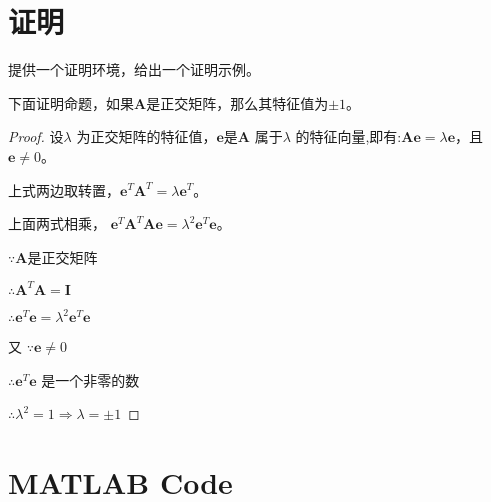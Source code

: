 

\lstset{language=Matlab}

\appendix
\begin{appendix}
\chapter{证明}
\begin{spacing}{1.5}
提供一个证明环境，给出一个证明示例。

下面证明命题，如果$\bm{A}$是正交矩阵，那么其特征值为$\pm1$。
\begin{proof}
设$\lambda$ 为正交矩阵的特征值，$\bm{e}$是$\bm{A}$ 属于$\lambda$ 的特征向量,即有:$\bm{A}\bm{e}=\lambda\bm{e}$，且$\bm{e}\neq0$。

上式两边取转置，$\bm{e}^{T}\bm{A}^{T}=\lambda\bm{e}^{T}$。

上面两式相乘， $\bm{e}^{T}\bm{A}^{T}\bm{A}\bm{e}=\lambda^2\bm{e}^{T}\bm{e}$。

$\because\bm{A}$是正交矩阵

$\therefore\bm{A}^{T}\bm{A}=\bm{I}$

$\therefore\bm{e}^{T}\bm{e}=\lambda^2\bm{e}^{T}\bm{e}$

又 $\because\bm{e}\neq0$

$\therefore\bm{e}^{T}\bm{e}$ 是一个非零的数

$\therefore\lambda^2=1\Rightarrow\lambda=\pm1$
\end{proof}



\end{spacing}


\chapter{MATLAB Code}


\end{appendix}
